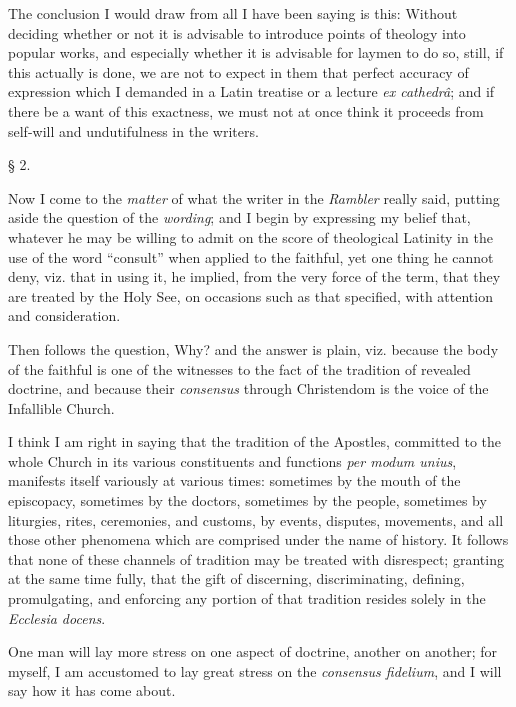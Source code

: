 The conclusion I would draw from all I have been
saying is this: Without deciding whether or not it is advisable to
introduce points of theology into popular works, and especially whether
it is advisable for laymen to do so, still, if this actually is done, we
are not to expect in them that perfect accuracy of expression which I
demanded in a Latin treatise or a lecture \emph{ex cathedrâ}; and if
there be a want of this exactness, we must not at once think it proceeds
from self-will and undutifulness in the writers.

§ 2.

Now I come to the \emph{matter} of what the writer
in the \emph{Rambler} really said, putting aside the question of the \emph{wording};
and I begin by expressing my belief that, whatever he may be
willing to admit on the score of theological Latinity in the use of the
word ``consult'' when applied to the faithful, yet one thing he cannot
deny, viz. that in using it, he implied, from the very force of the
term, that they are treated by the Holy See, on occasions such as that
specified, with attention and consideration.

Then follows the question, Why? and the answer is
plain, viz. because the body of the faithful is one of the witnesses to
the fact of the tradition of revealed doctrine, and because their \emph{consensus}
through Christendom is the voice of the Infallible Church.

I think I am right in saying that the tradition of
the Apostles, committed to the whole Church in its various constituents
and functions \emph{per modum unius}, manifests itself variously at
various times: sometimes by the mouth of the episcopacy, sometimes by
the doctors, sometimes by the people, sometimes by liturgies, rites,
ceremonies, and customs, by events, disputes, movements, and all those
other phenomena which are comprised under the name of history. It
follows that none of these channels of tradition may be treated with
disrespect; granting at the same time fully, that the gift of
discerning, discriminating, defining, promulgating, and enforcing any
portion of that tradition resides solely in the \emph{Ecclesia docens}.

One man will lay more stress on one aspect of
doctrine, another on another; for myself, I am accustomed to lay great
stress on the \emph{consensus fidelium}, and I will say how it has come
about.

